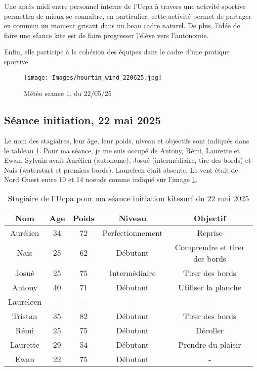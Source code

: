 \documentclass[11pt,a4paper]{report}
\begin{document}
Une après midi entre personnel interne de l'Ucpa à travers une 
activité sportive permettra  de mieux se connaître, 
en particulier, cette activité permet de partager en commun
un moment grisant dans un beau cadre naturel. De plus, l'idée
de faire une séance kite est de faire progresser l'élève vers 
l'autonomie.

Enfin, elle participe à la cohésion des équipes
dans le cadre d'une pratique sportive.

\begin{figure}
\centering
\texttt{[image: Images/hourtin\_wind\_220625.jpg]} 
\caption{Météo seance 1, du 22/05/25\label{meteo}}
\end{figure}

\subsection{Séance initiation, 22 mai 2025}

Le nom des stagiaires, leur \^age, leur poids, niveau et objectifs sont
indiqués dans le tableau \ref{stagiaires_table}.
Pour ma séance, je me suis occupé de Antony, Rémi, Laurette et Ewan.
Sylvain avait Aurélien (autonome), Josué (intermédiaire, tire des bords)
et Nais (waterstart et premiers bords).
Laureleen était absente. Le vent était de Nord Ouest entre 
10 et 14 noeuds comme indiqué sur l'image \ref{meteo}.

\begin{table}
\begin{tabular}{|c|c|c|c|c|}
        \hline
        \textbf{Nom} & \textbf{Age} & \textbf{Poids}& \textbf{Niveau}     &  \textbf{Objectif} \\ 
        \hline
        Aurélien      &  34          &  72           &   Perfectionnement  & Reprise \\
        Nais          &  25          &  62           &   Débutant          & Comprendre et tirer des bords \\
        Josué         &  25          &  75           &   Intermédiaire     & Tirer des bords \\
        Antony        &  40          &  71           &   Débutant          & Utiliser la planche  \\
        Laureleen     &  -           &  -            &   -                 &   -  \\
        Tristan       &  35          & 82            &  Débutant           & Tirer des bords  \\
        Rémi          &  25          & 75            &  Débutant           &  Décoller  \\
        Laurette      &  29          & 54            &  Débutant           & Prendre du plaisir \\
        Ewan          &  22          & 75            & Débutant            &  -  \\
        \hline
\end{tabular}
\caption{Stagiaire de l'Ucpa pour ma séance initiation kitesurf du 22 mai 2025\label{stagiaires_table}}
\end{table}
\end{document}
